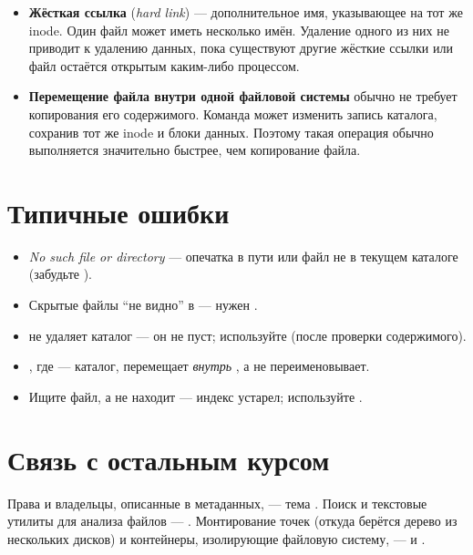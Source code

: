 \begin{itemize}
  \item \textbf{Жёсткая ссылка} (\emph{hard link}) ---
    дополнительное имя, указывающее на тот же inode.
    Один файл может иметь несколько имён.
    Удаление одного из них не приводит к удалению
    данных, пока существуют другие жёсткие ссылки
    или файл остаётся открытым каким-либо процессом.

  \item \textbf{Перемещение файла внутри одной
    файловой системы} обычно не требует копирования
    его содержимого. Команда  может изменить
    запись каталога, сохранив тот же inode и блоки
    данных. Поэтому такая операция обычно выполняется
    значительно быстрее, чем копирование файла.
\end{itemize}

\section{Типичные ошибки}
\begin{itemize}
  \item \emph{No such file or directory} --- опечатка в пути или
    файл не в текущем каталоге (забудьте ).
  \item Скрытые файлы ``не видно'' в  --- нужен .
  \item {} не удаляет каталог --- он не пуст; используйте
     (после проверки содержимого).
  \item {}, где  --- каталог, перемещает
     \emph{внутрь} , а не переименовывает.
  \item Ищите файл, а  не находит --- индекс устарел;
    используйте .
\end{itemize}

\section{Связь с остальным курсом}
Права и владельцы, описанные в метаданных, --- тема
. Поиск и текстовые утилиты для анализа
файлов --- . Монтирование точек
(откуда берётся дерево из нескольких дисков) и контейнеры,
изолирующие файловую систему, --- 
и .


